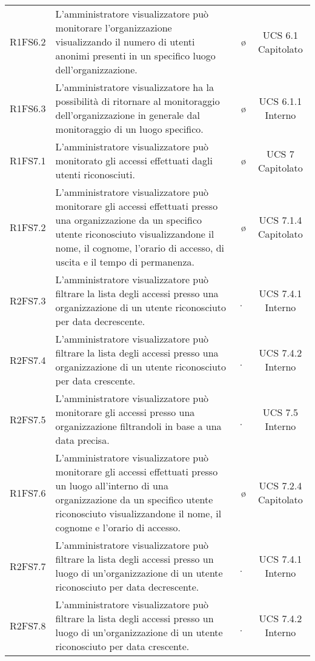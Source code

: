 {\begin{longtable}{ c C{6.5cm} c c}
R1FS6.2 & L'amministratore visualizzatore può monitorare l'organizzazione visualizzando il numero di utenti anonimi presenti in un specifico luogo dell'organizzazione. & \o & UCS 6.1 Capitolato\\

R1FS6.3 & L'amministratore visualizzatore ha la possibilità di ritornare al monitoraggio dell'organizzazione in generale dal monitoraggio di un luogo specifico. & \o & UCS 6.1.1 Interno\\

R1FS7.1 & L'amministratore visualizzatore può monitorato gli accessi effettuati dagli utenti riconosciuti. & \o & UCS 7 Capitolato\\

R1FS7.2 & L'amministratore visualizzatore può monitorare gli accessi effettuati presso una organizzazione da un specifico utente riconosciuto visualizzandone il nome, il cognome, l'orario di accesso, di uscita e il tempo di permanenza. & \o & UCS 7.1.4 Capitolato\\

R2FS7.3 & L’amministratore visualizzatore può filtrare la lista degli accessi presso una organizzazione di un utente riconosciuto per data decrescente. & \d & UCS 7.4.1 Interno \\

R2FS7.4 & L’amministratore visualizzatore può filtrare la lista degli accessi presso una organizzazione  di un utente riconosciuto per data crescente. & \d & UCS 7.4.2 Interno \\

R2FS7.5 & L'amministratore visualizzatore può monitorare gli accessi presso una organizzazione filtrandoli in base a una data precisa. & \d & UCS 7.5 Interno\\

R1FS7.6 & L'amministratore visualizzatore può monitorare gli accessi effettuati presso un luogo all'interno di una organizzazione da un specifico utente riconosciuto visualizzandone il nome, il cognome e l'orario di accesso. & \o & UCS 7.2.4 Capitolato\\

R2FS7.7 & L’amministratore visualizzatore può filtrare la lista degli accessi presso un luogo di un'organizzazione di un utente riconosciuto per data decrescente. & \d & UCS 7.4.1 Interno \\

R2FS7.8 & L’amministratore visualizzatore può filtrare la lista degli accessi presso un luogo di un'organizzazione di un utente riconosciuto per data crescente. & \d & UCS 7.4.2 Interno \\


\end{longtable}}

